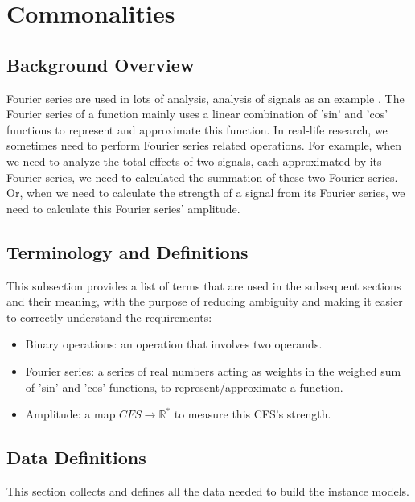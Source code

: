 \documentclass[12pt]{article}
\begin{document}
\section{Commonalities}\label{Sc:CA}

\subsection{Background Overview} \label{Sbsc:CA-Background}
Fourier series are used in lots of analysis, analysis of signals as an example 
\cite{papoulis1977signal}. The Fourier series of a function mainly uses 
a linear combination of 'sin' and 'cos' functions to represent and approximate 
this function. In real-life research, we sometimes need to perform Fourier 
series related operations. For example, when we need to analyze the total 
effects of two signals, each approximated by its Fourier series, 
we need to calculated the summation of these two Fourier series. 
Or, when we need to calculate the strength of a signal from its Fourier 
series, we need to calculate this Fourier series' amplitude.
\subsection{Terminology and Definitions}

This subsection provides a list of terms that are used in the subsequent
sections and their meaning, with the purpose of reducing ambiguity and making it
easier to correctly understand the requirements:

\begin{itemize}

\item Binary operations: an operation that involves two operands.
\item Fourier series: a series of real numbers acting as weights in the weighed sum of 'sin' and 'cos' functions, to represent/approximate a function.
\item Amplitude: a map $\mathit{CFS}\rightarrow \mathbb{R}^{*}$ to measure this CFS's strength.
\end{itemize}
\subsection{Data Definitions} \label{sec_datadef}

This section collects and defines all the data needed to build the instance
models.
~\newline
\end{document}
